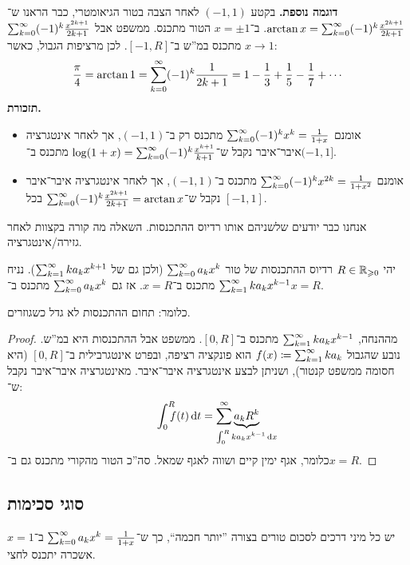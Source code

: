\documentclass[name=רשימות חדו''א 2א]{../../../tex/classes/noChapterMegasumPreamble}
\begin{document}
	\textbf{דוגמה נוספת. }בקטע $(-1 ,1)$ לאחר הצבה בטור הגיאומטרי, כבר הראנו ש־$\arctan x = \sum_{k = 0}^{\infty} (-1)^{k} \frac{x^{2k + 1}}{2k + 1}$. ב־$x = \pm 1$ הטור מתכנס. ממשפט אבל $\sum_{k = 0}^{\infty} (-1)^{k}\frac{x^{2k + 1}}{2k  +1}$ מתכנס במ''ש ב־$[-1, R]$. לכן מרציפות הגבול, כאשר $x \to 1$:
	\[ \frac{\pi}{4} = \arctan 1 = \sum_{k = 0}^{\infty} (-1)^{k}\frac{1}{2k + 1} = 1 - \frac{1}{3} + \frac{1}{5} - \frac{1}{7} + \cdots \]
	\textbf{תזכורת. }
	\begin{itemize}
		\item אומנם $\sum_{k = 0}^{\infty} (-1)^{k}x^{k} = \frac{1}{1 + x}$ מתכנס רק ב־$(-1, 1)$, אך לאחר אינטגרציה איבר־איבר נקבל ש־$\log(1 +x) = \sum_{k = 0}^{\infty} (-1)^{k}\frac{x^{k + 1}}{k + 1}$ מתכנס ב־$(-1, 1]$.
		\item אומנם $\sum_{k = 0}^{\infty} (-1)^{k}x^{2k} = \frac{1}{1 + x^{2}}$ מתכנס ב־$(-1, 1)$, אך לאחר אינטגרציה איבר־איבר נקבל ש־$\sum_{k = 0}^{\infty} (-1)^{k}\frac{x^{2k + 1}}{2k + 1} = \arctan x$ בכל $[-1, 1]$.
	\end{itemize}
	אנחנו כבר יודעים שלשניהם אותו רדיוס ההתכנסות. השאלה מה קורה בקצוות לאחר גזירה/אינטגרציה.

	\begin{Theorem}
		יהי $R \in \mathbb{R}_{\geqslant 0}$ רדיוס ההתכנסות של טור $\sum_{k = 0}^{\infty} a_kx^{k}$ (ולכן גם של $\sum_{k = 1}^{\infty} ka_kx^{k + 1}$). נניח $\sum_{k = 1}^{\infty} ka_kx^{k - 1}$ מתכנס ב־$x = R$. אז גם $\sum_{k = 0}^{\infty} a_kx^{k}$ מתכנס ב־$x =R$.
	\end{Theorem}
	כלומר: תחום ההתכנסות לא גדל כשגוזרים.
	\begin{proof}
		מההנחה, $\sum_{k = 1}^{\infty} ka_kx^{k - 1}$ מתכנס ב־$[0, R]$. ממשפט אבל ההתכנסות היא במ''ש. נובע שהגבול $f(x) \coloneqq \sum_{k = 1}^{\infty} ka_k$ הוא פונקציה רציפה, ובפרט אינטגרבילית ב־$[0, R]$ (היא חסומה ממשפט קנטור), ושניתן לבצע אינטגרציה איבר־איבר. מאינטגרציה איבר־איבר נקבל ש־:
		\[ \int^{R}_0 \dequad \ f(t)\dt = \sum^{\infty} \underbrace{a_kR^{k}}_{\mathclap{\int^{R}_0 ka_kx^{k - 1}\dx}} \]
		כלומר, אגף ימין קיים ושווה לאגף שמאל. סה''כ הטור מהקורי מתכנס גם ב־$x = R$.
	\end{proof}

\subsection{סוגי סכימות}

	יש כל מיני דרכים לסכום טורים בצורה ''יותר חכמה``, כך ש־$\sum_{k = 0}^{\infty} a_kx^{k} = \frac{1}{1 + x}$ ב־$x = 1$ אשכרה יתכנס לחצי.
\end{document}
